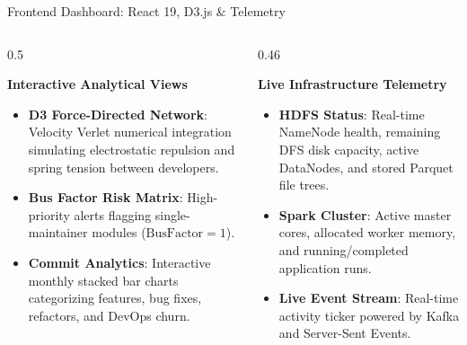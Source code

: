 \documentclass[aspectratio=169, 10pt]{beamer}
\begin{document}
\begin{frame}{Frontend Dashboard: React 19, D3.js \& Telemetry}
  \begin{columns}[T]
    \begin{column}{0.5\textwidth}
      \begin{block}{\textbf{Interactive Analytical Views}}
        \begin{itemize}
          \item \textbf{D3 Force-Directed Network}: Velocity Verlet numerical integration simulating electrostatic repulsion and spring tension between developers.
          \item \textbf{Bus Factor Risk Matrix}: High-priority alerts flagging single-maintainer modules ($\text{BusFactor} = 1$).
          \item \textbf{Commit Analytics}: Interactive monthly stacked bar charts categorizing features, bug fixes, refactors, and DevOps churn.
        \end{itemize}
      \end{block}
    \end{column}

    \begin{column}{0.46\textwidth}
      \begin{exampleblock}{\textbf{Live Infrastructure Telemetry}}
        \begin{itemize}
          \item \textbf{HDFS Status}: Real-time NameNode health, remaining DFS disk capacity, active DataNodes, and stored Parquet file trees.
          \item \textbf{Spark Cluster}: Active master cores, allocated worker memory, and running/completed application runs.
          \item \textbf{Live Event Stream}: Real-time activity ticker powered by Kafka and Server-Sent Events.
        \end{itemize}
      \end{exampleblock}
    \end{column}
  \end{columns}
\end{frame}
\end{document}
